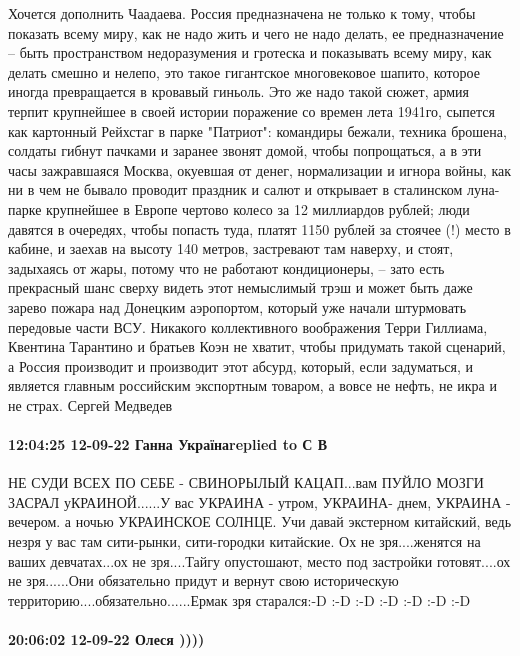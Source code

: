 Хочется дополнить Чаадаева. Россия предназначена не только к тому, чтобы
показать всему миру, как не надо жить и чего не надо делать, ее предназначение
-- быть пространством недоразумения и гротеска и показывать всему миру, как
делать смешно и нелепо, это такое гигантское многовековое шапито, которое
иногда превращается в кровавый гиньоль. Это же надо такой сюжет, армия терпит
крупнейшее в своей истории поражение со времен лета 1941го, сыпется как
картонный Рейхстаг в парке "Патриот": командиры бежали, техника брошена,
солдаты гибнут пачками и заранее звонят домой, чтобы попрощаться, а в эти часы
зажравшаяся Москва, окуевшая от денег, нормализации и игнора войны, как ни в
чем не бывало проводит праздник и салют и открывает в сталинском луна-парке
крупнейшее в Европе чертово колесо за 12 миллиардов рублей; люди давятся в
очередях, чтобы попасть туда, платят 1150 рублей за стоячее (!) место в кабине,
и заехав на высоту 140 метров, застревают там наверху, и стоят, задыхаясь от
жары, потому что не работают кондиционеры, -- зато есть прекрасный шанс сверху
видеть этот немыслимый трэш и может быть даже зарево пожара над Донецким
аэропортом, который уже начали штурмовать передовые части ВСУ. Никакого
коллективного воображения Терри Гиллиама, Квентина Тарантино и братьев Коэн не
хватит, чтобы придумать такой сценарий, а Россия производит и производит этот
абсурд, который, если задуматься, и является главным российским экспортным
товаром, а вовсе не нефть, не икра и не страх.
Сергей Медведев

\paragraph{12:04:25 12-09-22 Ганна Українаreplied to С В}

НЕ СУДИ ВСЕХ ПО СЕБЕ - СВИНОРЫЛЫЙ КАЦАП...вам ПУЙЛО МОЗГИ ЗАСРАЛ
уКРАИНОЙ......У вас УКРАИНА - утром, УКРАИНА- днем, УКРАИНА - вечером. а ночью
УКРАИНСКОЕ СОЛНЦЕ. Учи давай экстерном китайский, ведь незря у вас там
сити-рынки, сити-городки китайские. Ох не зря....женятся на ваших девчатах...ох
не зря....Тайгу опустошают, место под застройки готовят....ох не зря......Они
обязательно придут и вернут свою историческую
территорию....обязательно......Ермак зря старался:-D :-D :-D :-D :-D :-D :-D


\paragraph{20:06:02 12-09-22 Олеся ))))}

